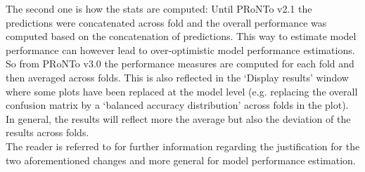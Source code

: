 The second one is how the stats are computed: Until PRoNTo v2.1 the predictions were concatenated across fold and the overall performance was computed based on the concatenation of predictions. This way to estimate model performance can however lead to over-optimistic model performance estimations. So from PRoNTo v3.0 the performance measures are computed for each fold and then averaged across folds. This is also reflected in the `Display results' window where some plots have been replaced at the model level (e.g. replacing the overall confusion matrix by a `balanced accuracy distribution' across folds in the plot). In general, the results will reflect more the average but also the deviation of the results across folds.
\\

The reader is referred to \cite{little2017using} for further information regarding the justification for the two aforementioned changes and more general for model performance estimation.








